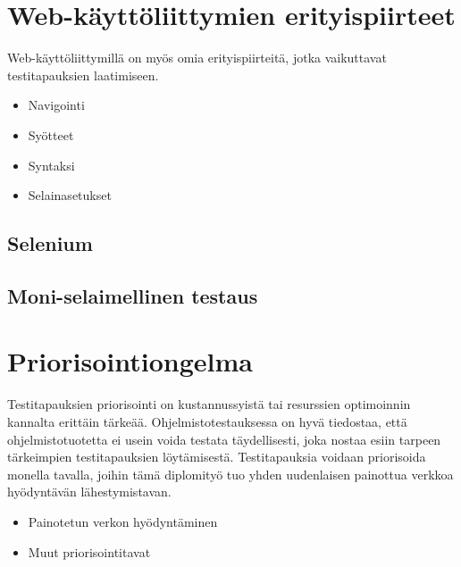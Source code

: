 \section{Web-käyttöliittymien erityispiirteet}

Web-käyttöliittymillä on myös omia erityispiirteitä, jotka vaikuttavat testitapauksien laatimiseen.
\begin{itemize}
  \item Navigointi
  \item Syötteet
  \item Syntaksi
  \item Selainasetukset
\end{itemize}

  \subsection{Selenium}


  \subsection{Moni-selaimellinen testaus}


\section{Priorisointiongelma}

Testitapauksien priorisointi on kustannussyistä tai resurssien optimoinnin kannalta erittäin tärkeää.
Ohjelmistotestauksessa on hyvä tiedostaa, että ohjelmistotuotetta ei usein voida testata täydellisesti, joka nostaa esiin tarpeen tärkeimpien testitapauksien löytämisestä.
Testitapauksia voidaan priorisoida monella tavalla, joihin tämä diplomityö tuo yhden uudenlaisen painottua verkkoa hyödyntävän lähestymistavan.
\begin{itemize}
  \item Painotetun verkon hyödyntäminen
  \item Muut priorisointitavat
\end{itemize}